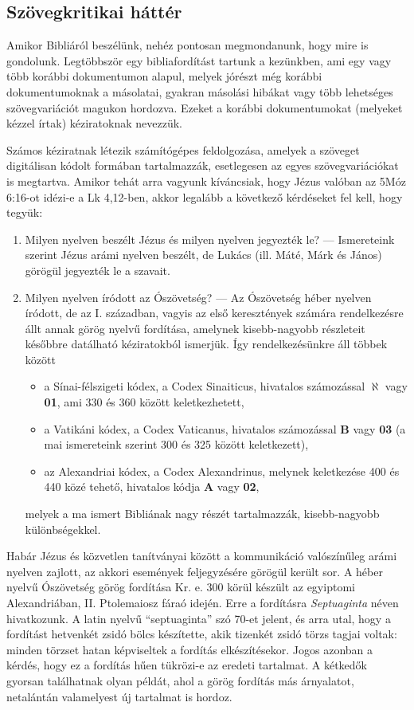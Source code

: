 \documentclass{article}
\begin{document}
\subsection{Szövegkritikai háttér}

Amikor Bibliáról beszélünk, nehéz pontosan megmondanunk, hogy mire is gondolunk. Legtöbbször
egy bibliafordítást tartunk a kezünkben, ami egy vagy több korábbi dokumentumon alapul,
melyek jórészt még korábbi dokumentumoknak a másolatai, gyakran másolási hibákat vagy
több lehetséges szövegvariációt magukon hordozva. Ezeket a korábbi dokumentumokat
(melyeket kézzel írtak) kéziratoknak nevezzük.

Számos kéziratnak létezik számítógépes feldolgozása, amelyek a szöveget
digitálisan kódolt formában tartalmazzák, esetlegesen az egyes szövegvariációkat
is megtartva. Amikor tehát arra vagyunk kíváncsiak, hogy Jézus valóban az 5Móz 6:16-ot idézi-e
a Lk 4,12-ben, akkor legalább a következő kérdéseket fel kell, hogy tegyük:
\begin{enumerate}
\item Milyen nyelven beszélt Jézus és milyen nyelven jegyezték le? --- Ismereteink szerint
Jézus arámi nyelven beszélt, de Lukács (ill. Máté, Márk és János) görögül jegyezték le a szavait.
\item Milyen nyelven íródott az Ószövetség? --- Az Ószövetség héber nyelven íródott,
de az I. században, vagyis az első keresztények számára rendelkezésre állt annak
görög nyelvű fordítása, amelynek kisebb-nagyobb részleteit későbbre datálható kéziratokból
ismerjük. Így rendelkezésünkre áll többek között
\begin{itemize}
\item a Sínai-félszigeti kódex,
a Codex Sinaiticus, hivatalos számozással $\boldsymbol{\aleph}$ vagy \textbf{01}, ami 330 és 360 között keletkezhetett,
\item a Vatikáni kódex, a Codex Vaticanus, hivatalos számozással \textbf{B} vagy \textbf{03} (a mai ismereteink szerint 300 és 325 között keletkezett),
\item az Alexandriai kódex, a Codex Alexandrinus, melynek keletkezése 400 és 440 közé tehető,
hivatalos kódja \textbf{A} vagy \textbf{02},
\end{itemize}
melyek a ma ismert Bibliának nagy részét tartalmazzák, kisebb-nagyobb különbségekkel.
\end{enumerate}
Habár Jézus és közvetlen tanítványai között a kommunikáció valószínűleg arámi nyelven zajlott,
az akkori események feljegyzésére görögül került sor. A héber nyelvű Ószövetség
görög fordítása Kr. e. 300 körül készült az egyiptomi Alexandriában, II. Ptolemaiosz fáraó idején.
Erre a fordításra \textit{Septuaginta} néven hivatkozunk.
A latin nyelvű ``septuaginta'' szó 70-et jelent, és arra utal, hogy a fordítást hetvenkét zsidó bölcs
készítette, akik tizenkét zsidó törzs tagjai voltak: minden törzset hatan képviseltek a fordítás elkészítésekor.
Jogos azonban a kérdés, hogy ez a fordítás hűen tükrözi-e az eredeti tartalmat. A kétkedők
gyorsan találhatnak olyan példát, ahol a görög fordítás más árnyalatot, netalántán valamelyest
új tartalmat is hordoz.
\end{document}
